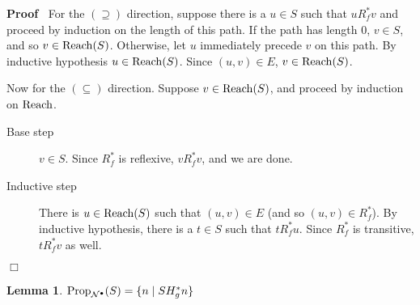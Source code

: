 \documentclass{article}
\newcommand{\tmop}[1]{\ensuremath{\operatorname{#1}}}
\newenvironment{proof}{\noindent\textbf{Proof\ }}{\hspace*{\fill}$\Box$\medskip}
\newtheorem{lemma}{Lemma}
\newcommand{\Net}{\ensuremath{\mathcal{N}}}
\newcommand{\Reach}{\textsf{\tmop{Reach}}}
\newcommand{\Prop}{\textsf{\tmop{Prop}}}
\begin{document}
\begin{proof}
  For the $(\supseteq)$ direction, suppose there is a $u \in S$ such that $u
  R^{\ast}_f v$ and proceed by induction on the length of this path. If the
  path has length 0, $v \in S$, and so $v \in \Reach (S)$. Otherwise, let $u$
  immediately precede $v$ on this path. By inductive hypothesis $u \in \Reach
  (S)$. Since $(u, v) \in E$, $v \in \Reach (S)$.
  
  Now for the $(\subseteq)$ direction. Suppose $v \in \Reach (S)$, and proceed
  by induction on $\Reach$.
  \begin{description}
    \item[Base step] $v \in S$. Since $R^{\ast}_f$ is reflexive, $v R^{\ast}_f
    v$, and we are done.
    
    \item[Inductive step] There is $u \in \Reach (S)$ such that $(u, v) \in E$
    (and so $(u, v) \in R^{\ast}_f$). By inductive hypothesis, there is a $t
    \in S$ such that $t R^{\ast}_f u$. Since $R^{\ast}_f$ is transitive, $t
    R^{\ast}_f v$ as well.
  \end{description}
\end{proof}

\begin{lemma}
  \label{lemma-Prop-and-H*}$\Prop_{\Net^{\bullet}} (S) = \{ n \mid S
  H_g^{\ast} n \}$
\end{lemma}
\end{document}
